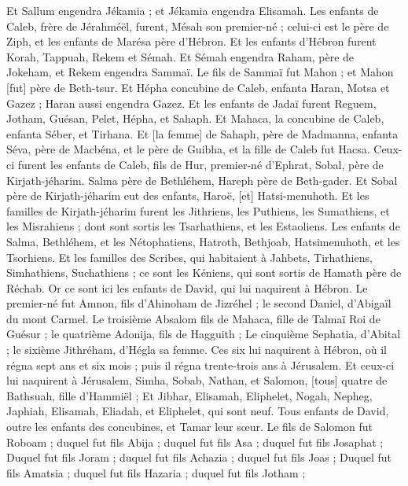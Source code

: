 \begin{multicols}{2}
Et Sallum engendra Jékamia ; et Jékamia engendra Elisamah.
Les enfants de Caleb, frère de Jérahméël, furent, Mésah son premier-né ; celui-ci est le père de Ziph, et les enfants de Marésa père d'Hébron.
Et les enfants d'Hébron furent Korah, Tappuah, Rekem et Sémah.
Et Sémah engendra Raham, père de Jokeham, et Rekem engendra Sammaï.
Le fils de Sammaï fut Mahon ; et Mahon [fut] père de Beth-tsur.
Et Hépha concubine de Caleb, enfanta Haran, Motsa et Gazez ; Haran aussi engendra Gazez.
Et les enfants de Jadaï furent Reguem, Jotham, Guésan, Pelet, Hépha, et Sahaph.
Et Mahaca, la concubine de Caleb, enfanta Séber, et Tirhana.
Et [la femme] de Sahaph, père de Madmanna, enfanta Séva, père de Macbéna, et le père de Guibha, et la fille de Caleb fut Hacsa.
Ceux-ci furent les enfants de Caleb, fils de Hur, premier-né d'Ephrat, Sobal, père de Kirjath-jéharim.
Salma père de Bethléhem, Hareph père de Beth-gader.
Et Sobal père de Kirjath-jéharim eut des enfants, Haroë, [et] Hatsi-menuhoth.
Et les familles de Kirjath-jéharim furent les Jithriens, les Puthiens, les Sumathiens, et les Misrahiens ; dont sont sortis les Tsarhathiens, et les Estaoliens.
Les enfants de Salma, Bethléhem, et les Nétophatiens, Hatroth, Bethjoab, Hatsimenuhoth, et les Tsorhiens.
Et les familles des Scribes, qui habitaient à Jahbets, Tirhathiens, Simhathiens, Suchathiens ; ce sont les Kéniens, qui sont sortis de Hamath père de Réchab.
\VerseOne{}Or ce sont ici les enfants de David, qui lui naquirent à Hébron. Le premier-né fut Amnon, fils d'Ahinoham de Jizréhel ; le second Daniel, d'Abigaïl du mont Carmel.
Le troisième Absalom fils de Mahaca, fille de Talmaï Roi de Guésur ; le quatrième Adonija, fils de Hagguith ;
Le cinquième Sephatia, d'Abital ; le sixième Jithréham, d'Hégla sa femme.
Ces six lui naquirent à Hébron, où il régna sept ans et six mois ; puis il régna trente-trois ans à Jérusalem.
Et ceux-ci lui naquirent à Jérusalem, Simha, Sobab, Nathan, et Salomon, [tous] quatre de Bathsuah, fille d'Hammiël ;
Et Jibhar, Elisamah, Eliphelet,
Nogah, Nepheg, Japhiah,
Elisamah, Eliadah, et Eliphelet, qui sont neuf.
Tous enfants de David, outre les enfants des concubines, et Tamar leur sœur.
Le fils de Salomon fut Roboam ; duquel fut fils Abija ; duquel fut fils Asa ; duquel fut fils Josaphat ;
Duquel fut fils Joram ; duquel fut fils Achazia ; duquel fut fils Joas ;
Duquel fut fils Amatsia ; duquel fut fils Hazaria ; duquel fut fils Jotham ;

\end{multicols}
